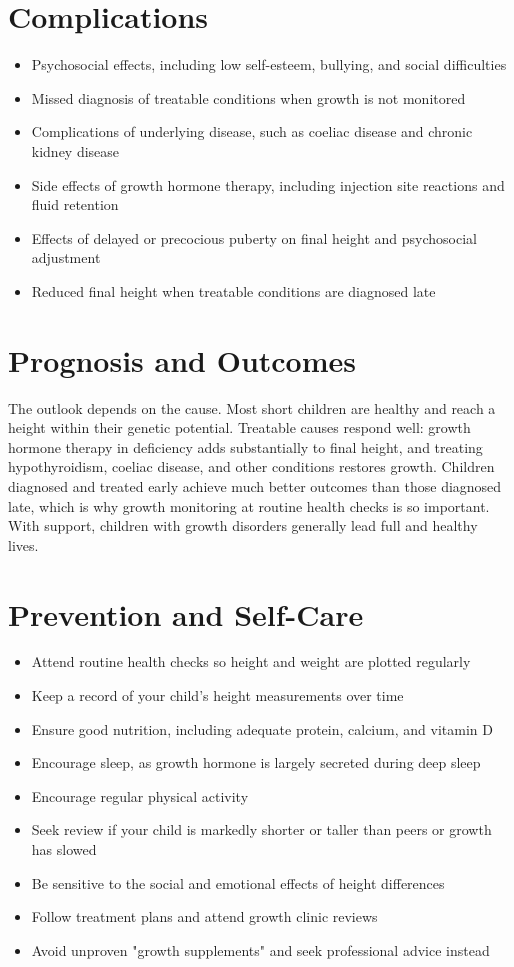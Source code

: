 \section*{Complications}
\begin{itemize}
    \item Psychosocial effects, including low self-esteem, bullying, and social difficulties
    \item Missed diagnosis of treatable conditions when growth is not monitored
    \item Complications of underlying disease, such as coeliac disease and chronic kidney disease
    \item Side effects of growth hormone therapy, including injection site reactions and fluid retention
    \item Effects of delayed or precocious puberty on final height and psychosocial adjustment
    \item Reduced final height when treatable conditions are diagnosed late
\end{itemize}

\section*{Prognosis and Outcomes}
The outlook depends on the cause. Most short children are healthy and reach a height within their genetic potential. Treatable causes respond well: growth hormone therapy in deficiency adds substantially to final height, and treating hypothyroidism, coeliac disease, and other conditions restores growth. Children diagnosed and treated early achieve much better outcomes than those diagnosed late, which is why growth monitoring at routine health checks is so important. With support, children with growth disorders generally lead full and healthy lives.

\section*{Prevention and Self-Care}
\begin{itemize}
    \item Attend routine health checks so height and weight are plotted regularly
    \item Keep a record of your child's height measurements over time
    \item Ensure good nutrition, including adequate protein, calcium, and vitamin D
    \item Encourage sleep, as growth hormone is largely secreted during deep sleep
    \item Encourage regular physical activity
    \item Seek review if your child is markedly shorter or taller than peers or growth has slowed
    \item Be sensitive to the social and emotional effects of height differences
    \item Follow treatment plans and attend growth clinic reviews
    \item Avoid unproven "growth supplements" and seek professional advice instead
\end{itemize}

